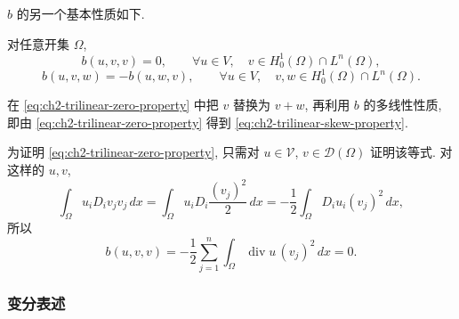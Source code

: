 $b$ 的另一个基本性质如下.

\begin{Lemma}
\label{lem:ch2-trilinear-skew-symmetry}
对任意开集 $\Omega$,
\begin{equation}
b(u,v,v)=0,
\qquad\forall u\in V,
\quad v\in H_0^1(\Omega)\cap L^n(\Omega),
\label{eq:ch2-trilinear-zero-property}
\end{equation}
\begin{equation}
b(u,v,w)=-b(u,w,v),
\qquad\forall u\in V,
\quad v,w\in H_0^1(\Omega)\cap L^n(\Omega).
\label{eq:ch2-trilinear-skew-property}
\end{equation}
\end{Lemma}

\begin{Proof}
在 \eqref{eq:ch2-trilinear-zero-property} 中把 $v$ 替换为 $v+w$, 再利用 $b$ 的多线性性质, 即由 \eqref{eq:ch2-trilinear-zero-property} 得到 \eqref{eq:ch2-trilinear-skew-property}.

为证明 \eqref{eq:ch2-trilinear-zero-property}, 只需对 $u\in\mathcal V$, $v\in\mathcal D(\Omega)$ 证明该等式. 对这样的 $u,v$,
\[
\int_\Omega u_iD_iv_jv_j\,dx
=\int_\Omega u_iD_i\frac{(v_j)^2}{2}\,dx
=-\frac12\int_\Omega D_iu_i(v_j)^2\,dx,
\]
所以
\begin{equation}
b(u,v,v)=-\frac12\sum_{j=1}^{n}\int_\Omega
\operatorname{div}u\,(v_j)^2\,dx=0.
\label{eq:ch2-trilinear-zero-proof}
\end{equation}
\end{Proof}

\subsubsection*{变分表述}

